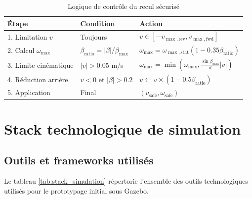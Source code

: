 \documentclass[a4paper,12pt]{report}
\begin{document}
\begin{table}[htbp]
    \centering
    \begin{tabular}{p{3cm}p{4cm}p{4cm}}
        \toprule
        \textbf{Étape} & \textbf{Condition} & \textbf{Action} \\
        \midrule
        1. Limitation $v$ & Toujours & $v \in [-v_{\max,\text{rev}}, v_{\max,\text{fwd}}]$ \\
        2. Calcul $\omega_{\max}$ & $\beta_{\text{ratio}} = |\beta|/\beta_{\max}$ & $\omega_{\max} = \omega_{\max,\text{stat}}(1-0.35\beta_{\text{ratio}})$ \\
        3. Limite cinématique & $|v| > 0.05$ m/s & $\omega_{\max} = \min(\omega_{\max}, \frac{\sin\beta_{\max}}{d}|v|)$ \\
        4. Réduction arrière & $v < 0$ et $|\beta| > 0.2$ & $v \leftarrow v \times (1-0.5\beta_{\text{ratio}})$ \\
        5. Application & Final & $(v_{\text{safe}}, \omega_{\text{safe}})$ \\
        \bottomrule
    \end{tabular}
    \caption{Logique de contrôle du recul sécurisé}
    \label{tab:logique_controle}
\end{table}

\section{Stack technologique de simulation}
\label{sec:stack_simulation}

\subsection{Outils et frameworks utilisés}
\label{subsec:outils_simulation}

Le tableau \ref{tab:stack_simulation} répertorie l'ensemble des outils technologiques utilisés pour le prototypage initial sous Gazebo.
\end{document}
